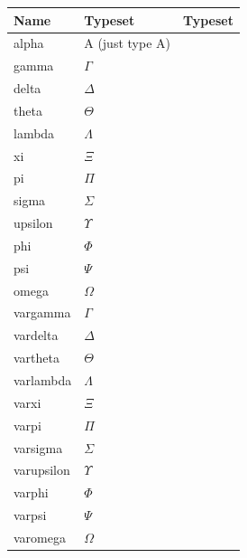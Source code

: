 \documentclass{sample}
\begin{document}
\begin{center}
	\begin{tabular}{llc}
	\toprule
	Name & Typeset & Typeset \\
	\midrule
	alpha & A (just type A)\\
	gamma & $\Gamma$\\
	delta & $\Delta$\\
	theta & $\Theta$\\
	lambda & $\Lambda$\\
	xi & $\Xi$\\
	pi & $\Pi$\\
	sigma & $\Sigma$\\
	upsilon & $\Upsilon$\\
	phi & $\Phi$\\
	psi & $\Psi$\\
	omega & $\Omega$\\
	vargamma & $\varGamma$\\
	vardelta & $\varDelta$\\
	vartheta & $\varTheta$\\
	varlambda & $\varLambda$\\
	varxi & $\varXi$\\
	varpi & $\varPi$\\
	varsigma & $\varSigma$\\
	varupsilon & $\varUpsilon$\\
	varphi & $\varPhi$\\
	varpsi & $\varPsi$\\
	varomega & $\varOmega$\\
	\bottomrule
	\end{tabular}
	\label{Ta:uppgreek2}
\end{center}
\newpage
\end{document}
